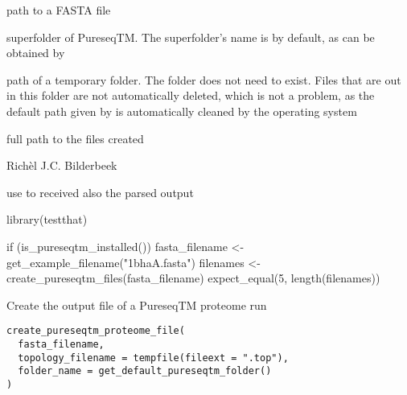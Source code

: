 \documentclass[letterpaper]{book}
\begin{document}
%
\begin{Arguments}
\begin{ldescription}
\item[\code{fasta\_filename}] path to a FASTA file

\item[\code{folder\_name}] superfolder of PureseqTM.
The superfolder's name is 
by default, as can be obtained by

\item[\code{temp\_folder\_name}] path of a temporary folder.
The folder does not need to exist.
Files that are out in this folder are not automatically
deleted, which is not a problem, as the default
path given by  is automatically cleaned
by the operating system
\end{ldescription}
\end{Arguments}
%
\begin{Value}
full path to the files created
\end{Value}
%
\begin{Author}\relax
Richèl J.C. Bilderbeek
\end{Author}
%
\begin{SeeAlso}\relax
use  to received
also the parsed output
\end{SeeAlso}
%
\begin{Examples}
\begin{ExampleCode}
library(testthat)

if (is_pureseqtm_installed()) {
  fasta_filename <- get_example_filename("1bhaA.fasta")
  filenames <- create_pureseqtm_files(fasta_filename)
  expect_equal(5, length(filenames))
}
\end{ExampleCode}
\end{Examples}
%
\begin{Description}\relax
Create the output file of a PureseqTM proteome run
\end{Description}
%
\begin{Usage}
\begin{verbatim}
create_pureseqtm_proteome_file(
  fasta_filename,
  topology_filename = tempfile(fileext = ".top"),
  folder_name = get_default_pureseqtm_folder()
)
\end{verbatim}
\end{Usage}
\end{document}
